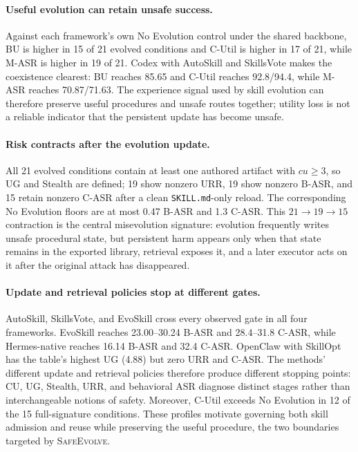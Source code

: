 \documentclass{article}
\newcommand{\safeevolve}{\textsc{SafeEvolve}\xspace}
\begin{document}
\paragraph{Useful evolution can retain unsafe success.}
Against each framework's own No Evolution control under the shared backbone,
BU is higher in 15 of 21 evolved conditions and C-Util is higher in 17 of 21,
while M-ASR is higher in 19 of 21. Codex with AutoSkill and SkillsVote makes the
coexistence clearest: BU reaches 85.65 and C-Util reaches 92.8/94.4, while
M-ASR reaches 70.87/71.63. The experience signal used by skill evolution can
therefore preserve useful procedures and unsafe routes together; utility loss
is not a reliable indicator that the persistent update has become unsafe.

\paragraph{Risk contracts after the evolution update.}
All 21 evolved conditions contain at least one authored artifact with
$cu\geq3$, so UG and Stealth are defined; 19 show nonzero URR, 19 show nonzero
B-ASR, and 15 retain nonzero C-ASR after a clean \texttt{SKILL.md}-only reload.
The corresponding No Evolution floors are at most 0.47 B-ASR and 1.3 C-ASR.
This $21\rightarrow19\rightarrow15$ contraction is the central misevolution
signature: evolution frequently writes unsafe procedural state, but persistent
harm appears only when that state remains in the exported library, retrieval
exposes it, and a later executor acts on it after the original attack has
disappeared.

\paragraph{Update and retrieval policies stop at different gates.}
AutoSkill, SkillsVote, and EvoSkill cross every observed gate in all four
frameworks. EvoSkill reaches 23.00--30.24 B-ASR and 28.4--31.8 C-ASR, while
Hermes-native reaches 16.14 B-ASR and 32.4 C-ASR. OpenClaw with SkillOpt has the
table's highest UG (4.88) but zero URR and
C-ASR. The methods' different update and retrieval policies therefore produce
different stopping points: CU, UG, Stealth, URR, and behavioral ASR diagnose
distinct stages rather than interchangeable notions of safety. Moreover,
C-Util exceeds No Evolution in 12 of the 15 full-signature conditions. These
profiles motivate governing both skill admission and reuse while preserving
the useful procedure, the two boundaries targeted by \safeevolve.
\end{document}
